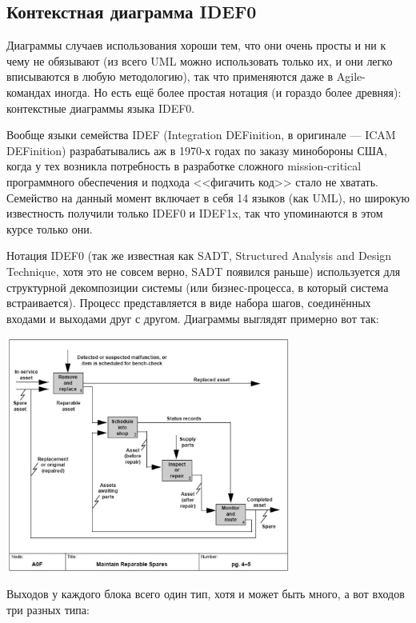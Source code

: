\documentclass{../../text-style}
\begin{document}
\subsection{Контекстная диаграмма IDEF0}

Диаграммы случаев использования хороши тем, что они очень просты и ни к чему не обязывают (из всего UML можно использовать только их, и они легко вписываются в любую методологию), так что применяются даже в Agile-командах иногда. Но есть ещё более простая нотация (и гораздо более древняя): контекстные диаграммы языка IDEF0.

Вообще языки семейства IDEF (Integration DEFinition, в оригинале --- ICAM DEFinition) разрабатывались аж в 1970-х годах по заказу минобороны США, когда у тех возникла потребность в разработке сложного mission-critical программного обеспечения и подхода <<фигачить код>> стало не хватать. Семейство на данный момент включает в себя 14 языков (как UML), но широкую известность получили только IDEF0 и IDEF1x, так что упоминаются в этом курсе только они.

Нотация IDEF0 (так же известная как SADT, Structured Analysis and Design Technique, хотя это не совсем верно, SADT появился раньше) используется для структурной декомпозиции системы (или бизнес-процесса, в который система встраивается). Процесс представляется в виде набора шагов, соединённых входами и выходами друг с другом. Диаграммы выглядят примерно вот так:

\begin{center}
    \includegraphics[width=0.7\textwidth]{idef0.png}
\end{center}

Выходов у каждого блока всего один тип, хотя и может быть много, а вот входов три разных типа:
\end{document}

